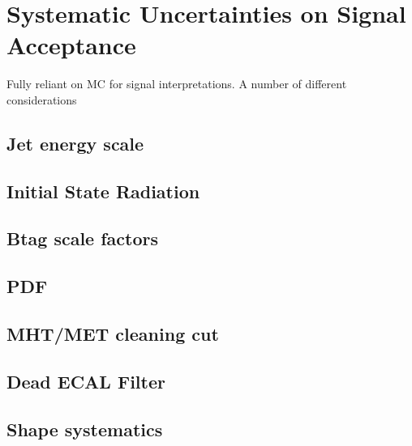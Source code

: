 
\section{Systematic Uncertainties on Signal Acceptance }  %
\label{sec:interpretation_uncertainties}

Fully reliant on MC for signal interpretations.
A number of different considerations

\subsection{Jet energy scale}
\subsection{Initial State Radiation}
\subsection{Btag scale factors}
\subsection{PDF}
\subsection{MHT/MET cleaning cut}
\subsection{Dead ECAL Filter}
\subsection{Shape systematics}
